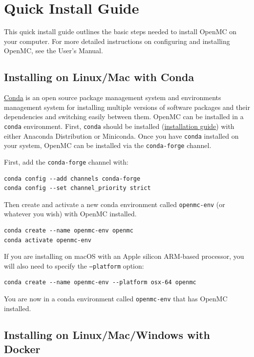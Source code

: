 \section{Quick Install Guide}
\label{quickinstall}

This quick install guide outlines the basic steps needed to install OpenMC on
your computer. For more detailed instructions on configuring and installing
OpenMC, see the User's Manual.

\subsection*{Installing on Linux/Mac with Conda}

\href{https://docs.conda.io/en/latest/}{Conda} is an open source package management
system and environments management system for installing multiple versions of
software packages and their dependencies and switching easily between them.
OpenMC can be installed in a \texttt{conda} environment. First, \texttt{conda} should be
installed (\href{https://www.anaconda.com/docs/getting-started/getting-started}{installation guide})
with either Anaconda Distribution or Miniconda. Once you have \texttt{conda} installed
on your system, OpenMC can be installed via the \texttt{conda-forge} channel.

First, add the \texttt{conda-forge} channel with:

\begin{verbatim}
conda config --add channels conda-forge
conda config --set channel_priority strict
\end{verbatim}

Then create and activate a new conda environment called \texttt{openmc-env} (or whatever
you wish) with OpenMC installed.

\begin{verbatim}
conda create --name openmc-env openmc
conda activate openmc-env
\end{verbatim}

If you are installing on macOS with an Apple silicon ARM-based processor, you
will also need to specify the \texttt{--platform} option:

\begin{verbatim}
conda create --name openmc-env --platform osx-64 openmc
\end{verbatim}

You are now in a conda environment called \texttt{openmc-env} that has OpenMC installed.

\subsection*{Installing on Linux/Mac/Windows with Docker}

